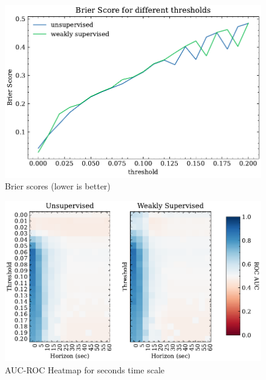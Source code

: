 \begin{figure}[htbp]
\centering
  \includegraphics{5Results/figs/bsle/brier_score_for_thresholds.pdf}
  \caption{Brier scores (lower is better)}
\end{figure}
\begin{figure}[htbp]
\centering
  \includegraphics{5Results/figs/bsle/auc_roc_scores_for_thresholds_and_horizons_sec.pdf}
  \caption{AUC-ROC Heatmap for seconds time scale}
\end{figure}

